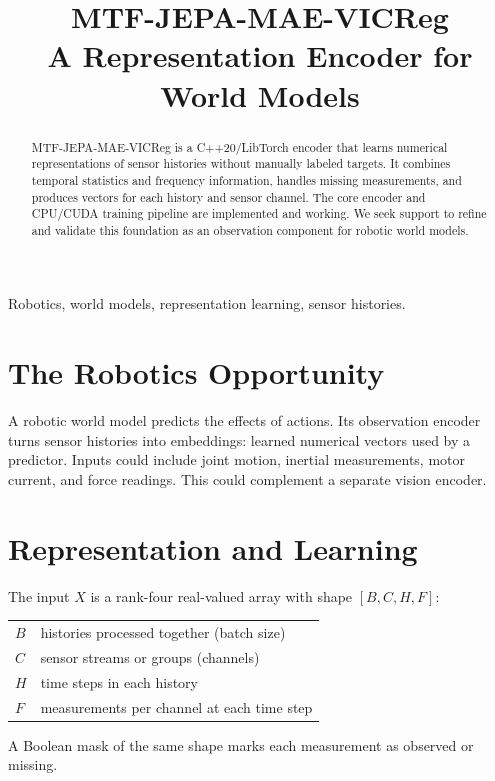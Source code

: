 

\title{MTF-JEPA-MAE-VICReg\\[4pt]
{\Large A Representation Encoder for World Models}}
\author{
}
\date{}


\maketitle

\begin{abstract}
MTF-JEPA-MAE-VICReg is a C++20/LibTorch encoder that learns numerical
representations of sensor histories without manually labeled targets. It combines
temporal statistics and frequency information, handles missing measurements, and
produces vectors for each history and sensor channel. The core encoder and
CPU/CUDA training pipeline are implemented and working. We seek support to refine
and validate this foundation as an observation component for robotic world models.
\end{abstract}

\begin{IEEEkeywords}
Robotics, world models, representation learning, sensor histories.
\end{IEEEkeywords}

\balance
\section{The Robotics Opportunity}
A robotic world model predicts the effects of actions. Its observation encoder
turns sensor histories into embeddings: learned numerical vectors used by a
predictor. Inputs could include joint motion, inertial measurements, motor current,
and force readings. This could complement a separate vision encoder.

\section{Representation and Learning}
The input $X$ is a rank-four real-valued array with shape $[B,C,H,F]$:
\begin{center}
\begin{tabular}{@{}l@{\quad}p{}@{}}
$B$ & histories processed together (batch size) \\
$C$ & sensor streams or groups (channels) \\
$H$ & time steps in each history \\
$F$ & measurements per channel at each time step
\end{tabular}
\end{center}
A Boolean mask of the same shape marks each measurement as observed or missing.

